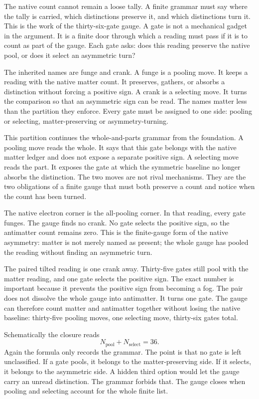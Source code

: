 The native count cannot remain a loose tally. A finite grammar must say where
the tally is carried, which distinctions preserve it, and which distinctions
turn it. This is the work of the thirty-six-gate gauge. A gate is not a
mechanical gadget in the argument. It is a finite door through which a
reading must pass if it is to count as part of the gauge. Each gate asks:
does this reading preserve the native pool, or does it select an asymmetric
turn?

The inherited names are funge and crank. A funge is a pooling move. It
keeps a reading with the native matter count. It preserves, gathers, or
absorbs a distinction without forcing a positive sign. A crank is a
selecting move. It turns the comparison so that an asymmetric sign can be
read. The names matter less than the partition they enforce. Every gate must
be assigned to one side: pooling or selecting, matter-preserving or
asymmetry-turning.

This partition continues the whole-and-parts grammar from the foundation. A
pooling move reads the whole. It says that this gate belongs with the native
matter ledger and does not expose a separate positive sign. A selecting move
reads the part. It exposes the gate at which the symmetric baseline no
longer absorbs the distinction. The two moves are not rival mechanisms. They
are the two obligations of a finite gauge that must both preserve a count and
notice when the count has been turned.

The native electron corner is the all-pooling corner. In that reading, every
gate funges. The gauge finds no crank. No gate selects the positive sign, so
the antimatter count remains zero. This is the finite-gauge form of the
native asymmetry: matter is not merely named as present; the whole gauge has
pooled the reading without finding an asymmetric turn.

The paired tilted reading is one crank away. Thirty-five gates still pool
with the matter reading, and one gate selects the positive sign. The exact
number is important because it prevents the positive sign from becoming a
fog. The pair does not dissolve the whole gauge into antimatter. It turns one
gate. The gauge can therefore count matter and antimatter together without
losing the native baseline: thirty-five pooling moves, one selecting move,
thirty-six gates total.

Schematically the closure reads
\[
  N_{\mathrm{pool}} + N_{\mathrm{select}} = 36.
\]
Again the formula only records the grammar. The point is that no gate is
left unclassified. If a gate pools, it belongs to the matter-preserving side.
If it selects, it belongs to the asymmetric side. A hidden third option would
let the gauge carry an unread distinction. The grammar forbids that. The
gauge closes when pooling and selecting account for the whole finite list.

